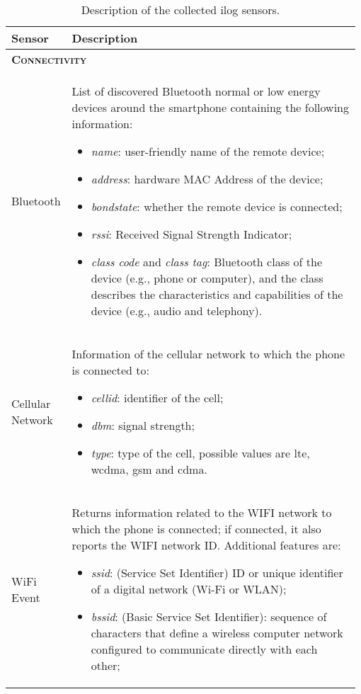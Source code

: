 \begin{center}
\renewcommand{\arraystretch}{1.5}
\begin{longtable}{p{0.15\linewidth}|p{0.83\linewidth}}
    \caption[ilog sensors]{Description of the collected ilog sensors.} \label{tab:sensor} \\
    \toprule
    \textbf{Sensor} & \textbf{Description} \\
    \midrule
    \endfirsthead
    \multicolumn{2}{l}{\textbf{\textsc{Connectivity}}} \\
    Bluetooth & 
    List of discovered Bluetooth normal or low energy devices around the smartphone containing the following information:
    \begin{itemize}
        \item \textit{name}: user-friendly name of the remote device;
        \item \textit{address}: hardware MAC Address of the device;
        \item \textit{bondstate}: whether the remote device is connected;
        \item \textit{rssi}: Received Signal Strength Indicator;
        \item \textit{class code} and \textit{class tag}: Bluetooth class of the device (e.g., phone or computer), and the class describes the characteristics and capabilities of the device (e.g., audio and telephony).
    \end{itemize}\\
    Cellular Network &
    Information of the cellular network to which the phone is connected to:
    \begin{itemize}
        \item \textit{cellid}: identifier of the cell;
        \item \textit{dbm}: signal strength;
        \item \textit{type}: type of the cell, possible values are lte, wcdma, gsm and cdma.
    \end{itemize}\\
    WiFi Event & 
    Returns information related to the WIFI network to which the phone is connected; if connected, it also reports the WIFI network ID. Additional features are:
    \begin{itemize}
        \item \textit{ssid}: (Service Set Identifier) ID or unique identifier of a digital network (Wi-Fi or WLAN);
        \item \textit{bssid}: (Basic Service Set Identifier): sequence of characters that define a wireless computer network configured to communicate directly with each other;

\end{itemize}
\end{longtable}
\end{center}
